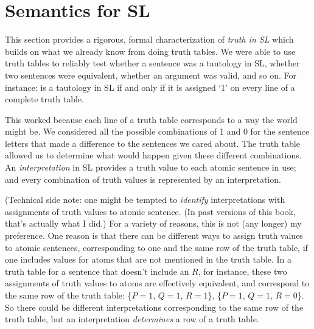 

\section{Semantics for SL}
\label{sec.semanticsSL}

This section provides a rigorous, formal characterization of \emph{truth in SL} which builds on what we already know from doing truth tables. We were able to use truth tables to reliably test whether a sentence was a tautology in SL, whether two sentences were equivalent, whether an argument was valid, and so on. For instance: \metaA{} is a tautology in SL if and only if it is assigned `1' on every line of a complete truth table.

This worked because each line of a truth table corresponds to a way the world might be. We considered all the possible combinations of 1 and 0 for the sentence letters that made a difference to the sentences we cared about. The truth table allowed us to determine what would happen given these different combinations. An \emph{interpretation} in SL provides a truth value to each atomic sentence in use; and every combination of truth values is represented by an interpretation.

(Technical side note: one might be tempted to \emph{identify} interpretations with assignments of truth values to atomic sentence. (In past versions of this book, that's actually what I did.) For a variety of reasons, this is not (any longer) my preference. One reason is that there can be different ways to assign truth values to atomic sentences, corresponding to one and the same row of the truth table, if one includes values for atoms that are not mentioned in the truth table. In a truth table for a sentence that doesn't include an $R$, for instance, these two assignments of truth values to atoms are effectively equivalent, and correspond to the same row of the truth table: \{$P=1$, $Q=1$, $R=1$\}, \{$P=1$, $Q=1$, $R=0$\}. So there could be different interpretations corresponding to the same row of the truth table, but an interpretation \emph{determines} a row of a truth table.


